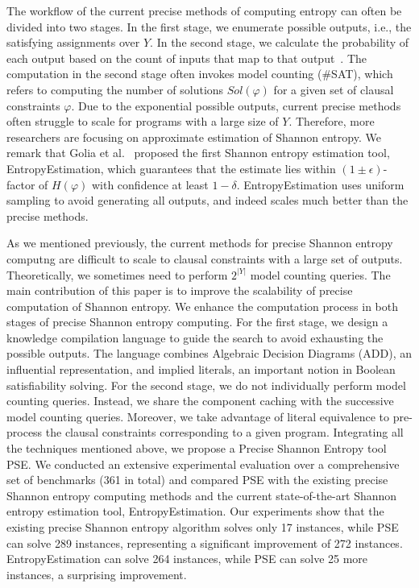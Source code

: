 The workflow of the current precise methods of computing entropy can often be divided into two stages. 
In the first stage, we enumerate possible outputs, i.e., the satisfying assignments over $Y$. 
In the second stage, we calculate the probability of each output based on the count of inputs that map to that output~\cite{golia2022scalable}.
The computation in the second stage often invokes model counting (\#SAT), which refers to computing the number of solutions $\mathit{Sol}(\varphi)$ for a given set of clausal constraints $\varphi$. 
Due to the exponential possible outputs, current precise methods often struggle to scale for programs with a large size of $Y$.
Therefore, more researchers are focusing on approximate estimation of Shannon entropy.
We remark that Golia et al.~\cite{golia2022scalable} proposed the first Shannon entropy estimation tool, EntropyEstimation, which guarantees that the estimate lies within $(1 \pm \epsilon)$-factor of $H(\varphi)$ with confidence at least $1-\delta$.
EntropyEstimation uses uniform sampling to avoid generating all outputs, and indeed scales much better than the precise methods. 

As we mentioned previously, the current methods for precise Shannon entropy computng are difficult to scale to clausal constraints with a large set of outputs.
Theoretically, we sometimes need to perform $2^{|Y|}$ model counting queries. 
The main contribution of this paper is to improve the scalability of precise computation of Shannon entropy. 
We enhance the computation process in both stages of precise Shannon entropy computing.
For the first stage, we design a knowledge compilation language to guide the search to avoid exhausting the possible outputs. 
The language combines Algebraic Decision Diagrams (ADD), an influential representation, and implied literals, an important notion in Boolean satisfiability solving.
For the second stage, we do not individually perform model counting queries.
Instead, we share the component caching with the successive model counting queries.
Moreover, we take advantage of literal equivalence to pre-process the clausal constraints corresponding to a given program.
Integrating all the techniques mentioned above, we propose a Precise Shannon Entropy tool PSE.
We conducted an extensive experimental evaluation over a comprehensive set of benchmarks (361 in total) and compared PSE with the existing precise Shannon entropy computing methods and the current state-of-the-art Shannon entropy estimation tool, EntropyEstimation.
Our experiments show that the existing precise Shannon entropy algorithm solves only 17 instances, while PSE can solve 289 instances, representing a significant improvement of 272 instances.
EntropyEstimation can solve 264 instances, while PSE can solve 25 more instances, a surprising improvement.

